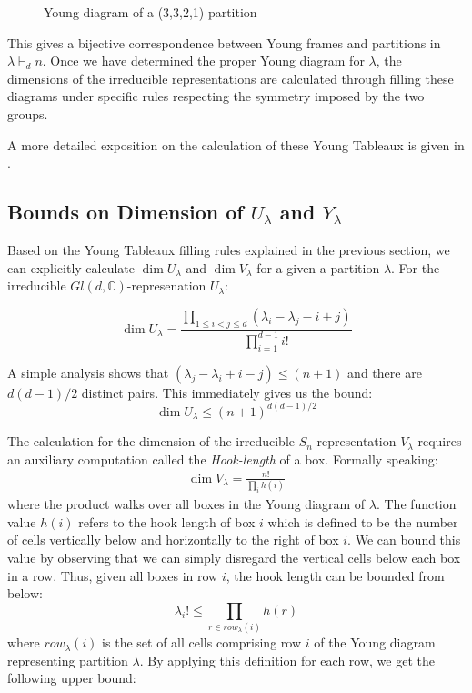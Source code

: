 \documentclass[12pt]{article}%
\begin{document}
\begin{figure}[ht]
    \centering
    \caption{Young diagram of a (3,3,2,1) partition}
    \label{fig:yd}
\end{figure}

This gives a bijective correspondence between Young frames and partitions in $\lambda \vdash_d n$. Once we have determined the proper Young diagram for $\lambda$, the dimensions of the irreducible representations are calculated through filling these diagrams under specific rules respecting the symmetry imposed by the two groups.



A more detailed exposition on the calculation of these Young Tableaux is given in \cite{FH}.

\subsection{Bounds on Dimension of $U_\lambda$ and $Y_\lambda$}
Based on the Young Tableaux filling rules explained in the previous section, we can explicitly calculate $\dim U_\lambda$ and $\dim V_\lambda$ for a given a partition $\lambda$. For the irreducible $Gl(d, \mathbb{C})$-represenation $U_\lambda$:

$$ \dim U_\lambda = \frac{\prod_{1 \leq i<j \leq d} (\lambda_i - \lambda_j - i + j)}{\prod_{i=1}^{d-1} i!} $$

A simple analysis shows that $(\lambda_j - \lambda_i +i - j) \leq (n+1)$ and there are $d(d-1)/2$ distinct pairs. This immediately gives us the bound:
\begin{equation}\label{ubound}
  \dim U_\lambda \leq (n + 1)^{d(d-1)/2}
\end{equation}

The calculation for the dimension of the irreducible $S_n$-representation $V_\lambda$ requires an auxiliary computation called the \textit{Hook-length} of a box. Formally speaking:
\begin{gather*}
  \dim V_\lambda = \frac{n!}{\prod_{i} h(i)}
\end{gather*}
where the product walks over all boxes in the Young diagram of $\lambda$. The function value $h(i)$ refers to the hook length of box $i$ which is defined to be the number of cells vertically below and horizontally to the right of box $i$. We can bound this value by observing that we can simply disregard the vertical cells below each box in a row. Thus, given all boxes in row $i$, the hook length can be bounded from below:
$$ \lambda_i! \leq \prod_{r \in row_\lambda(i)} h(r) $$ where $row_\lambda(i)$ is the set of all cells comprising row $i$ of the Young diagram representing partition $\lambda$. By applying this definition for each row, we get the following upper bound:
\end{document}
